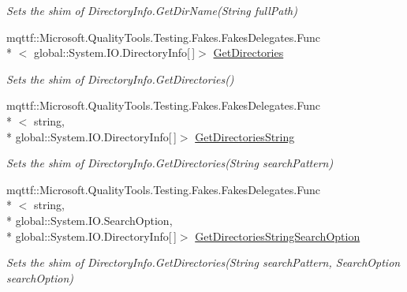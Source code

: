 \begin{DoxyCompactItemize}
\begin{DoxyCompactList}\small\item\em Sets the shim of Directory\-Info.\-Get\-Dir\-Name(\-String full\-Path)\end{DoxyCompactList}\item 
mqttf\-::\-Microsoft.\-Quality\-Tools.\-Testing.\-Fakes.\-Fakes\-Delegates.\-Func\\*
$<$ global\-::\-System.\-I\-O.\-Directory\-Info\mbox{[}$\,$\mbox{]}$>$ \hyperlink{class_system_1_1_i_o_1_1_fakes_1_1_shim_directory_info_a9fe25e9e013dcabb799ba608c55bb4a2}{Get\-Directories}
\begin{DoxyCompactList}\small\item\em Sets the shim of Directory\-Info.\-Get\-Directories()\end{DoxyCompactList}\item 
mqttf\-::\-Microsoft.\-Quality\-Tools.\-Testing.\-Fakes.\-Fakes\-Delegates.\-Func\\*
$<$ string, \\*
global\-::\-System.\-I\-O.\-Directory\-Info\mbox{[}$\,$\mbox{]}$>$ \hyperlink{class_system_1_1_i_o_1_1_fakes_1_1_shim_directory_info_a1cc4108a9c89f70653363ac8acf80467}{Get\-Directories\-String}
\begin{DoxyCompactList}\small\item\em Sets the shim of Directory\-Info.\-Get\-Directories(\-String search\-Pattern)\end{DoxyCompactList}\item 
mqttf\-::\-Microsoft.\-Quality\-Tools.\-Testing.\-Fakes.\-Fakes\-Delegates.\-Func\\*
$<$ string, \\*
global\-::\-System.\-I\-O.\-Search\-Option, \\*
global\-::\-System.\-I\-O.\-Directory\-Info\mbox{[}$\,$\mbox{]}$>$ \hyperlink{class_system_1_1_i_o_1_1_fakes_1_1_shim_directory_info_a73e69f4d2bd48fdc697c70305ea92055}{Get\-Directories\-String\-Search\-Option}
\begin{DoxyCompactList}\small\item\em Sets the shim of Directory\-Info.\-Get\-Directories(\-String search\-Pattern, Search\-Option search\-Option)\end{DoxyCompactList}\item 

\end{DoxyCompactItemize}
